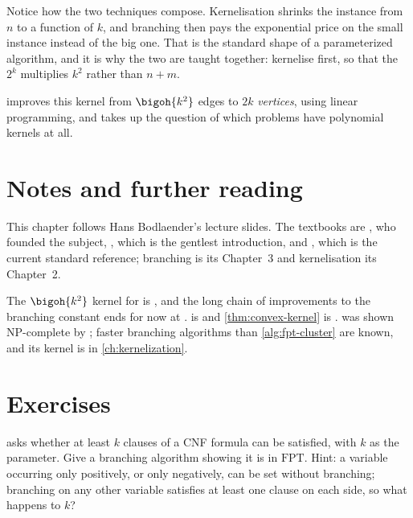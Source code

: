 \begin{intuition}
Notice how the two techniques compose. Kernelisation shrinks the instance from
$n$ to a function of $k$, and branching then pays the exponential price on the
small instance instead of the big one. That is the standard shape of a
parameterized algorithm, and it is why the two are taught together: kernelise
first, so that the $2^k$ multiplies $k^2$ rather than $n+m$.

 improves this kernel from $\bigoh{k^2}$ edges to $2k$
\emph{vertices}, using linear programming, and takes up the question of which
problems have polynomial kernels at all.
\end{intuition}

\section{Notes and further reading}
\label{sec:fpt-i-further-reading}

This chapter follows Hans Bodlaender's lecture slides. The textbooks are
\citet{DowneyFellows2013}, who founded the subject,
\citet{Niedermeier2006}, which is the gentlest introduction, and
\citet{CyganEtAl2015}, which is the current standard reference; branching is its
Chapter~3 and kernelisation its Chapter~2.

The $\bigoh{k^2}$ kernel for  is \citet{BussGoldsmith1993},
and the long chain of improvements to the branching constant ends for now at
\citet{ChenKanjXia2010}.  is
\citet{GrammNiedermeierRossmanith2003} and \cref{thm:convex-kernel} is
\citet{MoranSnir2005}.  was shown
\textrm{NP}-complete by \citet{ShamirSharanTsur2002}; faster branching
algorithms than \cref{alg:fpt-cluster} are known, and its kernel is in
\cref{ch:kernelization}.

\section{Exercises}
\label{sec:ex-fpt-i}

\begin{exercise}
 asks whether at least $k$ clauses of a CNF formula can be
satisfied, with $k$ as the parameter. Give a branching algorithm showing it is
in $\mathrm{FPT}$. Hint: a variable occurring only positively, or only
negatively, can be set without branching; branching on any other variable
satisfies at least one clause on each side, so what happens to $k$?
\end{exercise}

